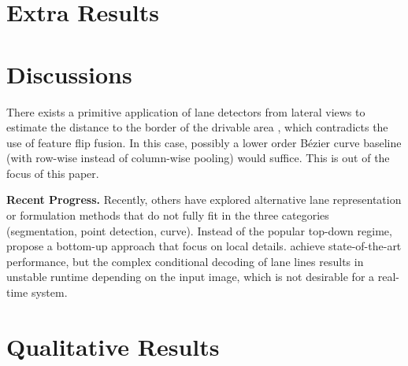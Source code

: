 \documentclass[10pt,twocolumn,letterpaper]{article}
\begin{document}
\section{Extra Results}
\label{sec:extra}

\begin{table}[h]
    \centering
    \caption{Ablation study on TuSimple (\textit{test} set Accuracy) and LLAMAS (\textit{val} set F1), before and after adding the Feature Flip Fusion module. Reported 3-times average with the ResNet-34 backbone, since ablations often are not stable enough on these datasets to exhibit a clear difference between methods.}
    \label{tab:moreabl}
    \vspace{-6mm}
\end{table}

\section{Discussions}
\label{sec:dis}


There exists a primitive application of lane detectors from lateral views to estimate the distance to the border of the drivable area \cite{gurghian2016deeplanes}, which contradicts the use of feature flip fusion. In this case, possibly a lower order Bézier curve baseline (with row-wise instead of column-wise pooling) would suffice. This is out of the focus of this paper.


\noindent \textbf{Recent Progress.} Recently, others have explored alternative lane representation or formulation methods that do not fully fit in the three categories (segmentation, point detection, curve). Instead of the popular top-down regime, \cite{qu2021focus} propose a bottom-up approach that focus on local details. \cite{liu2021condlanenet} achieve state-of-the-art performance, but the complex conditional decoding of lane lines results in unstable runtime depending on the input image, which is not desirable for a real-time system.


\section{Qualitative Results}
\label{sec:qualitative}
\end{document}
